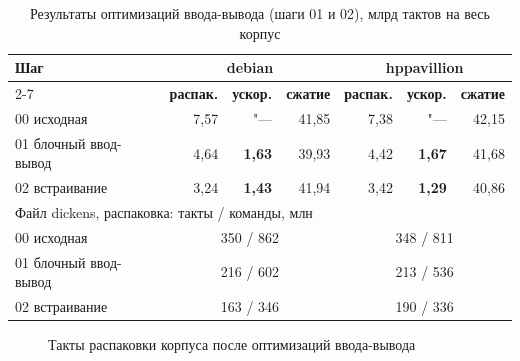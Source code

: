 \begin{table}[H]
\caption{Результаты оптимизаций ввода-вывода (шаги 01 и 02), млрд тактов на весь корпус}
\label{tab:res-11-12}
\begin{tabletext}
\centering
\begin{tabular}{|l|r|r|r|r|r|r|}
\hline
\multirow{2}{*}{\textbf{Шаг}} & \multicolumn{3}{c|}{\textbf{debian}} & \multicolumn{3}{c|}{\textbf{hppavillion}} \\
\cline{2-7}
 & \textbf{распак.} & \textbf{ускор.} & \textbf{сжатие} & \textbf{распак.} & \textbf{ускор.} & \textbf{сжатие} \\
\hline
00 исходная & 7,57 & "--- & 41,85 & 7,38 & "--- & 42,15 \\
01 блочный ввод-вывод & 4,64 & \textbf{1,63} & 39,93 & 4,42 & \textbf{1,67} & 41,68 \\
02 встраивание & 3,24 & \textbf{1,43} & 41,94 & 3,42 & \textbf{1,29} & 40,86 \\
\hline
\multicolumn{7}{|l|}{Файл dickens, распаковка: такты / команды, млн} \\
\hline
00 исходная & \multicolumn{3}{c|}{350 / 862} & \multicolumn{3}{c|}{348 / 811} \\
01 блочный ввод-вывод & \multicolumn{3}{c|}{216 / 602} & \multicolumn{3}{c|}{213 / 536} \\
02 встраивание & \multicolumn{3}{c|}{163 / 346} & \multicolumn{3}{c|}{190 / 336} \\
\hline
\end{tabular}
\end{tabletext}
\end{table}

\begin{figure}[H]
\centering
{}
\caption{Такты распаковки корпуса после оптимизаций ввода-вывода}
\label{fig:decompress-io}
\end{figure}

